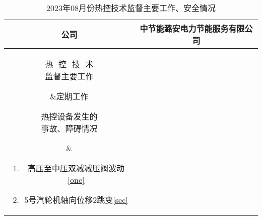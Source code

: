 \begin{table}[htbp]
	\centering
	\caption{2023年08月份热控技术监督主要工作、安全情况}
\begin{tabular}{|c|c|}
\hline
	公司 & 中节能潞安电力节能服务有限公司\tabularnewline
\hline
	\parbox[c][50ex][c]{6em}{热\,\,\,\,控\,\,\,\,技\,\,\,\,术\\监督主要工作}&定期工作\tabularnewline  
\hline
	\parbox[c][50ex][c]{7em}{热控设备发生的\\事故、障碍情况}&
		\begin{minipage}[c][50ex][c]{35em}
			\begin{enumerate}
				\item 高压至中压双减减压阀波动\ref{one}
				\item 5号汽轮机轴向位移2跳变\ref{sec}
			\end{enumerate}
		\end{minipage}
	\tabularnewline  
\hline
	\tabularnewline
\hline
\end{tabular}
\end{table}
\clearpage
